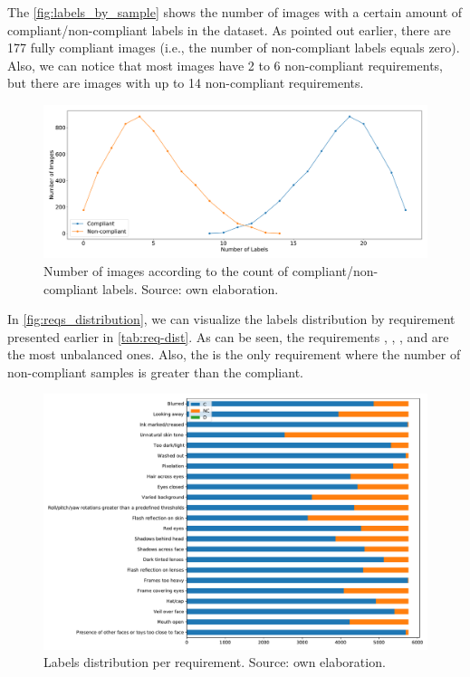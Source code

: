 The \autoref{fig:labels_by_sample} shows the number of images with a certain amount of compliant/non-compliant labels in the \adhoc dataset. As pointed out earlier, there are 177 fully compliant images (i.e., the number of non-compliant labels equals zero). Also, we can notice that most images have 2 to 6 non-compliant requirements, but there are images with up to 14 non-compliant requirements.

\begin{figure}
\centering
\includegraphics[width=\linewidth]{images/labels_by_sample.pdf}
\caption{Number of images according to the count of compliant/non-compliant labels. Source: own elaboration.}
\label{fig:labels_by_sample}
\end{figure}

In \autoref{fig:reqs_distribution}, we can visualize the labels distribution by requirement presented earlier in \autoref{tab:req-dist}. As can be seen, the requirements \inkmarked, \washedout, \framestooheavy, and \otherfacesortoys are the most unbalanced ones. Also, the \unnaturalskintone is the only requirement where the number of non-compliant samples is greater than the compliant.

\begin{figure}
\centering
\includegraphics[width=\linewidth]{images/reqs_distribution.pdf}
\caption{Labels distribution per requirement. Source: own elaboration.}
\label{fig:reqs_distribution}
\end{figure}

